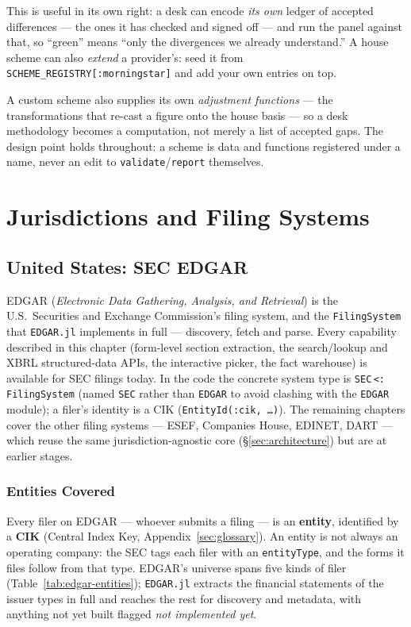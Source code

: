 \documentclass[11pt,a4paper]{report}
\begin{document}
\noindent This is useful in its own right: a desk can encode \emph{its own} ledger of accepted differences
--- the ones it has checked and signed off --- and run the panel against that, so ``green'' means ``only the
divergences we already understand.'' A house scheme can also \emph{extend} a provider's: seed it from
\texttt{SCHEME\_REGISTRY[:morningstar]} and add your own entries on top.

A custom scheme also supplies its own \emph{adjustment functions} --- the transformations that re-cast a
figure onto the house basis --- so a desk methodology becomes a computation, not merely a list of accepted
gaps. The design point holds throughout: a scheme is data and functions registered under a name, never an
edit to \texttt{validate}/\texttt{report} themselves.

\part{Jurisdictions and Filing Systems}

\chapter{United States: SEC EDGAR}
\label{sys:edgar}

EDGAR (\emph{Electronic Data Gathering, Analysis, and Retrieval}) is the U.S.\ Securities and
Exchange Commission's filing system, and the \texttt{FilingSystem} that \texttt{EDGAR.jl} implements
in full --- discovery, fetch and parse. Every capability described in this chapter (form-level
section extraction, the search/lookup and XBRL structured-data APIs, the interactive picker, the
fact warehouse) is available for SEC filings today. In the code the concrete system type is
\texttt{SEC}\,\texttt{<:}\,\texttt{FilingSystem} (named \texttt{SEC} rather than \texttt{EDGAR} to
avoid clashing with the \texttt{EDGAR} module); a filer's identity is a CIK
(\texttt{EntityId(:cik,\ \ldots)}). The remaining chapters cover the other filing systems --- ESEF,
Companies House, EDINET, DART --- which reuse the same jurisdiction-agnostic core
(\S\ref{sec:architecture}) but are at earlier stages.

\section{Entities Covered}\label{sec:edgar-entities}

Every filer on EDGAR --- whoever submits a filing --- is an \textbf{entity}, identified by a \textbf{CIK}
(Central Index Key, Appendix~\ref{sec:glossary}). An entity is not always an operating company: the SEC tags each
filer with an \texttt{entityType}, and the forms it files follow from that type. EDGAR's universe spans five
kinds of filer (Table~\ref{tab:edgar-entities}); \texttt{EDGAR.jl} extracts the financial statements of the
issuer types in full and reaches the rest for discovery and metadata, with anything not yet built flagged
\emph{not implemented yet}.
\end{document}
